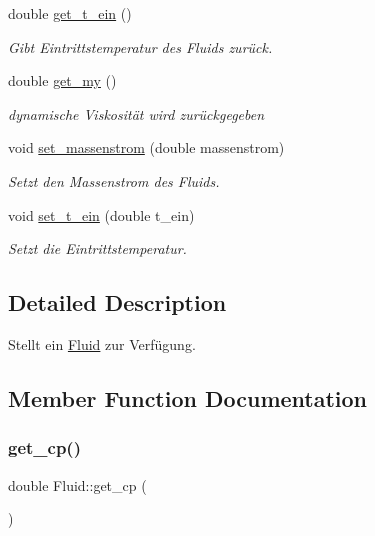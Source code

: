 \begin{DoxyCompactItemize}
double \hyperlink{class_fluid_a60d0c9269a8c8af00bf8828c7f764537}{get\+\_\+t\+\_\+ein} ()
\begin{DoxyCompactList}\small\item\em Gibt Eintrittstemperatur des Fluids zurück. \end{DoxyCompactList}\item 
double \hyperlink{class_fluid_a80d39a71b73f5ac4cffcaceb61b9e0ee}{get\+\_\+my} ()
\begin{DoxyCompactList}\small\item\em dynamische Viskosität wird zurückgegeben \end{DoxyCompactList}\item 
void \hyperlink{class_fluid_af70884f77d5dd43499fcc70969100498}{set\+\_\+massenstrom} (double massenstrom)
\begin{DoxyCompactList}\small\item\em Setzt den Massenstrom des Fluids. \end{DoxyCompactList}\item 
void \hyperlink{class_fluid_a9449846d8fd4bf31d8685eefa55d4a57}{set\+\_\+t\+\_\+ein} (double t\+\_\+ein)
\begin{DoxyCompactList}\small\item\em Setzt die Eintrittstemperatur. \end{DoxyCompactList}\end{DoxyCompactItemize}


\subsection{Detailed Description}
Stellt ein \hyperlink{class_fluid}{Fluid} zur Verfügung. 

\subsection{Member Function Documentation}
\mbox{\label{class_fluid_a86bf10785c4c5822eabf9245f0b39ae0}} 
\subsubsection{\texorpdfstring{get\+\_\+cp()}{get\_cp()}}
{\footnotesize\ttfamily double Fluid\+::get\+\_\+cp (\begin{DoxyParamCaption}{ }\end{DoxyParamCaption})}



